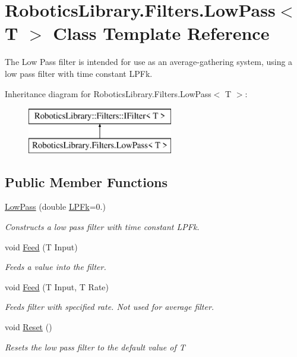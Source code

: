 \hypertarget{class_robotics_library_1_1_filters_1_1_low_pass}{}\section{Robotics\+Library.\+Filters.\+Low\+Pass$<$ T $>$ Class Template Reference}
\label{class_robotics_library_1_1_filters_1_1_low_pass}


The Low Pass filter is intended for use as an average-\/gathering system, using a low pass filter with time constant {\ttfamily L\+P\+Fk}. 


Inheritance diagram for Robotics\+Library.\+Filters.\+Low\+Pass$<$ T $>$\+:\begin{figure}[H]
\begin{center}
\leavevmode
\includegraphics[height=2.000000cm]{d4/d3a/class_robotics_library_1_1_filters_1_1_low_pass}
\end{center}
\end{figure}
\subsection*{Public Member Functions}
\begin{DoxyCompactItemize}
\item 
\hyperlink{class_robotics_library_1_1_filters_1_1_low_pass_ada79534600a7f4a4dab17c40976a2f74}{Low\+Pass} (double \hyperlink{class_robotics_library_1_1_filters_1_1_low_pass_aa10538fde21bb3d7a4c5640b615c4013}{L\+P\+Fk}=0.)
\begin{DoxyCompactList}\small\item\em Constructs a low pass filter with time constant {\ttfamily L\+P\+Fk}.\end{DoxyCompactList}\item 
void \hyperlink{class_robotics_library_1_1_filters_1_1_low_pass_adba4c542b4935845404729ebb2222b72}{Feed} (T Input)
\begin{DoxyCompactList}\small\item\em Feeds a value into the filter. \end{DoxyCompactList}\item 
void \hyperlink{class_robotics_library_1_1_filters_1_1_low_pass_a9b8d610c0f54a17e84ea5e9252c9e215}{Feed} (T Input, T Rate)
\begin{DoxyCompactList}\small\item\em Feeds filter with specified rate. Not used for average filter. \end{DoxyCompactList}\item 
void \hyperlink{class_robotics_library_1_1_filters_1_1_low_pass_a4cc6f562359e222b75c634075cfc4881}{Reset} ()
\begin{DoxyCompactList}\small\item\em Resets the low pass filter to the default value of {\ttfamily T} \end{DoxyCompactList}\end{DoxyCompactItemize}
